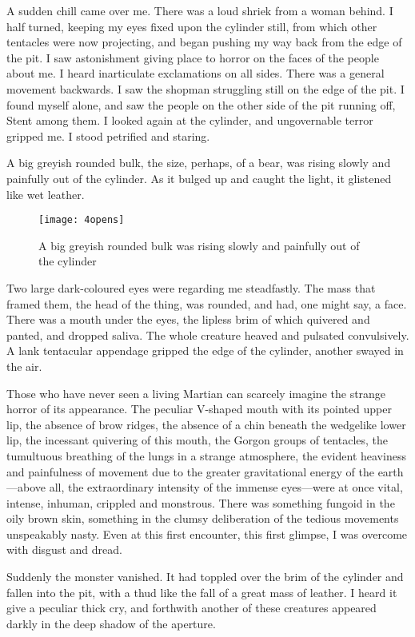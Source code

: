A sudden chill came over me. There was a loud shriek from a woman behind. I half turned, keeping my eyes fixed upon the cylinder still, from which other tentacles were now projecting, and began pushing my way back from the edge of the pit. I saw astonishment giving place to horror on the faces of the people about me. I heard inarticulate exclamations on all sides. There was a general movement backwards. I saw the shopman struggling still on the edge of the pit. I found myself alone, and saw the people on the other side of the pit running off, Stent among them. I looked again at the cylinder, and ungovernable terror gripped me. I stood petrified and staring.

A big greyish rounded bulk, the size, perhaps, of a bear, was rising slowly and painfully out of the cylinder. As it bulged up and caught the light, it glistened like wet leather.

\begin{figure}[p]
\centering
\texttt{[image: 4opens]}
\caption[A big greyish rounded bulk was rising out of the cylinder]{A big greyish rounded bulk was rising slowly and painfully out of the cylinder}
\end{figure}

Two large dark-coloured eyes were regarding me steadfastly. The mass that framed them, the head of the thing, was rounded, and had, one might say, a face. There was a mouth under the eyes, the lipless brim of which quivered and panted, and dropped saliva. The whole creature heaved and pulsated convulsively. A lank tentacular appendage gripped the edge of the cylinder, another swayed in the air.

Those who have never seen a living Martian can scarcely imagine the strange horror of its appearance. The peculiar V-shaped mouth with its pointed upper lip, the absence of brow ridges, the absence of a chin beneath the wedgelike lower lip, the incessant quivering of this mouth, the Gorgon groups of tentacles, the tumultuous breathing of the lungs in a strange atmosphere, the evident heaviness and painfulness of movement due to the greater gravitational energy of the earth—above all, the extraordinary intensity of the immense eyes—were at once vital, intense, inhuman, crippled and monstrous. There was something fungoid in the oily brown skin, something in the clumsy deliberation of the tedious movements unspeakably nasty. Even at this first encounter, this first glimpse, I was overcome with disgust and dread.

Suddenly the monster vanished. It had toppled over the brim of the cylinder and fallen into the pit, with a thud like the fall of a great mass of leather. I heard it give a peculiar thick cry, and forthwith another of these creatures appeared darkly in the deep shadow of the aperture.

